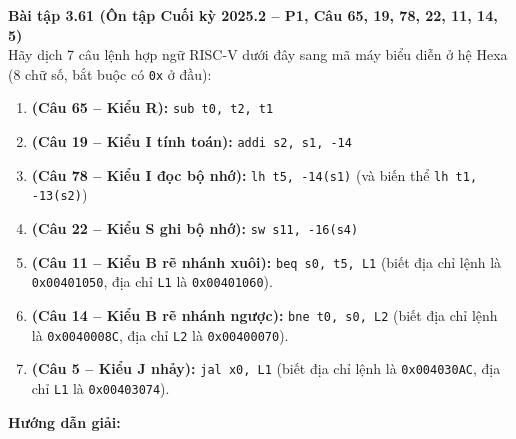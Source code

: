 \textbf{Bài tập 3.61 (Ôn tập Cuối kỳ 2025.2 -- P1, Câu 65, 19, 78, 22, 11, 14, 5)}\\
Hãy dịch 7 câu lệnh hợp ngữ RISC-V dưới đây sang mã máy biểu diễn ở hệ Hexa (8 chữ số, bắt buộc có \texttt{0x} ở đầu):
\begin{enumerate}[label=\alph*)]
    \item \textbf{(Câu 65 -- Kiểu R):} \texttt{sub t0, t2, t1}
    \item \textbf{(Câu 19 -- Kiểu I tính toán):} \texttt{addi s2, s1, -14}
    \item \textbf{(Câu 78 -- Kiểu I đọc bộ nhớ):} \texttt{lh t5, -14(s1)} (và biến thể \texttt{lh t1, -13(s2)})
    \item \textbf{(Câu 22 -- Kiểu S ghi bộ nhớ):} \texttt{sw s11, -16(s4)}
    \item \textbf{(Câu 11 -- Kiểu B rẽ nhánh xuôi):} \texttt{beq s0, t5, L1} (biết địa chỉ lệnh là \texttt{0x00401050}, địa chỉ \texttt{L1} là \texttt{0x00401060}).
    \item \textbf{(Câu 14 -- Kiểu B rẽ nhánh ngược):} \texttt{bne t0, s0, L2} (biết địa chỉ lệnh là \texttt{0x0040008C}, địa chỉ \texttt{L2} là \texttt{0x00400070}).
    \item \textbf{(Câu 5 -- Kiểu J nhảy):} \texttt{jal x0, L1} (biết địa chỉ lệnh là \texttt{0x004030AC}, địa chỉ \texttt{L1} là \texttt{0x00403074}).
\end{enumerate}
\textbf{Hướng dẫn giải:}
